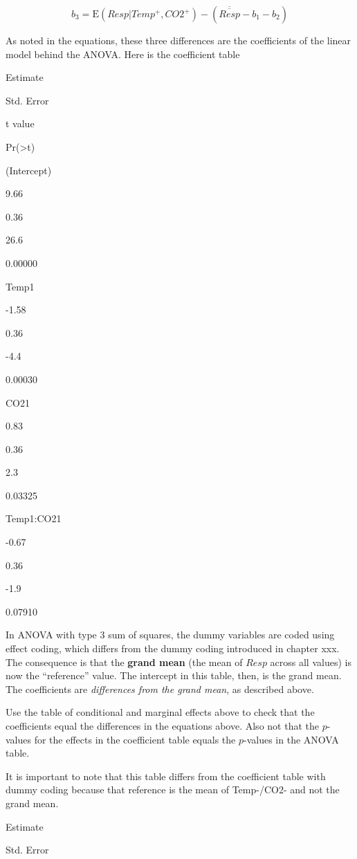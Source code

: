 \documentclass[]{book}
\begin{document}
\begin{equation}
b_3 = \mathrm{E}(Resp|Temp^+, CO2^+) - (\overline{\overline{Resp}} - b_1 - b_2)
\end{equation}

As noted in the equations, these three differences are the coefficients
of the linear model behind the ANOVA. Here is the coefficient table

Estimate

Std. Error

t value

Pr(\textgreater{}\textbar{}t\textbar{})

(Intercept)

9.66

0.36

26.6

0.00000

Temp1

-1.58

0.36

-4.4

0.00030

CO21

0.83

0.36

2.3

0.03325

Temp1:CO21

-0.67

0.36

-1.9

0.07910

In ANOVA with type 3 sum of squares, the dummy variables are coded using
effect coding, which differs from the dummy coding introduced in chapter
xxx. The consequence is that the \textbf{grand mean} (the mean of
\(Resp\) across all values) is now the ``reference'' value. The
intercept in this table, then, is the grand mean. The coefficients are
\emph{differences from the grand mean}, as described above.

Use the table of conditional and marginal effects above to check that
the coefficients equal the differences in the equations above. Also not
that the \(p\)-values for the effects in the coefficient table equals
the \(p\)-values in the ANOVA table.

It is important to note that this table differs from the coefficient
table with dummy coding because that reference is the mean of Temp-/CO2-
and not the grand mean.

Estimate

Std. Error
\end{document}
